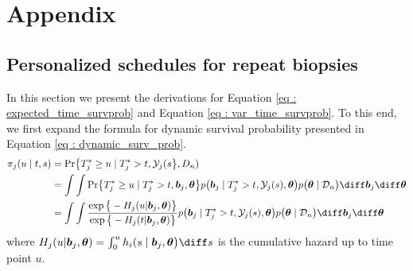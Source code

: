
\section{Appendix}

\subsection{Personalized schedules for repeat biopsies}
In this section we present the derivations for Equation \ref{eq : expected_time_survprob} and Equation \ref{eq : var_time_survprob}. To this end, we first expand the formula for dynamic survival probability presented in Equation \ref{eq : dynamic_surv_prob}.
\begin{equation}
\label{eq : dyn_surv_prob_expanded}
\begin{split}
\pi_j(u \mid t, s) &= \mbox{Pr}\big\{T^*_j \geq u \mid  T^*_j >t, \mathcal{Y}_j(s\big\}, D_n)\\
&= \int \int \mbox{Pr}\big\{T^*_j \geq u \mid  T^*_j >t, \boldsymbol{b}_j,\boldsymbol{\theta}\big\} p\big(\boldsymbol{b}_j \mid T^*_j>t, \mathcal{Y}_j(s), \boldsymbol{\theta}\big)p\big(\boldsymbol{\theta} \mid \mathcal{D}_n\big) \diff \boldsymbol{b}_j \diff \boldsymbol{\theta}\\
&= \int \int \frac{\exp\big\{-H_j(u | \boldsymbol{b}_j, \boldsymbol{\theta})\big\}}{\exp\big\{-H_j(t | \boldsymbol{b}_j, \boldsymbol{\theta})\big\}} p\big(\boldsymbol{b}_j \mid T^*_j>t, \mathcal{Y}_j(s), \boldsymbol{\theta}\big)p\big(\boldsymbol{\theta} \mid \mathcal{D}_n\big) \diff \boldsymbol{b}_j \diff \boldsymbol{\theta}
\end{split}
\end{equation}
where $H_j(u | \boldsymbol{b}_j, \boldsymbol{\theta}) = \int_0^u h_i(s \mid \boldsymbol{b}_j, \boldsymbol{\theta}\big)\diff s$ is the cumulative hazard up to time point $u$.


